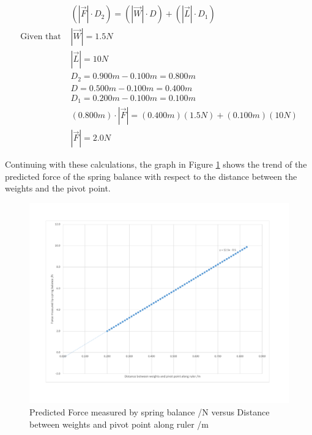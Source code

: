 \documentclass[letterpaper, 12pt]{article}
\begin{document}
\begin{align*}
    \\
                       & \left(\left|\vec{F}\right|\cdot D_2\right) = \left(\left|\vec{W}\right|\cdot D\right) + \left(\left|\vec{L}\right|\cdot D_1\right)
    \\
    \text{Given that } & \left|\vec{W}\right| = 1.5\unit{N}
    \\
                       & \left|\vec{L}\right| = 10\unit{N}
    \\
                       & D_2 = 0.900\unit{m} - 0.100\unit{m} = 0.800\unit{m}
    \\
                       & D = 0.500\unit{m} - 0.100\unit{m} = 0.400\unit{m}
    \\
                       & D_1 = 0.200\unit{m} - 0.100\unit{m} = 0.100\unit{m}
    \\
                       & (0.800\unit{m})\cdot \left|\vec{F}\right| = (0.400\unit{m})(1.5\unit{N}) + (0.100\unit{m})(10\unit{N})
    \\
                       & \left|\vec{F}\right| = 2.0\unit{N}
\end{align*}

Continuing with these calculations, the graph in Figure \ref*{fig:predGraph} shows the
trend of the predicted force of the spring balance with respect to the distance
between the weights and the pivot point.

\begin{figure}[H]
    \centering
    \includegraphics[width=\textwidth]{predictedGraph.pdf}
    \caption{Predicted Force measured by spring balance /\unit{N} versus Distance between weights and pivot point along ruler /\unit{m}}
    \label{fig:predGraph}
\end{figure}
\end{document}
